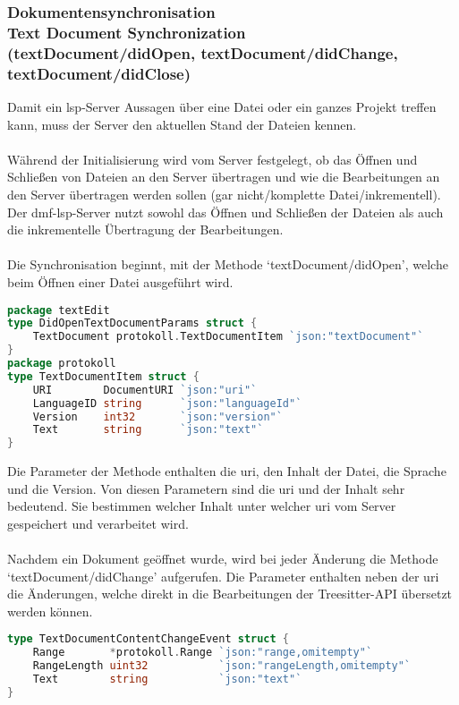 \documentclass[./einleitung.tex]{subfiles}
\begin{document}
    \subsubsection[Dokumentensynchronisation]{Dokumentensynchronisation\\ {\textnormal{\footnotesize Text Document Synchronization \\ (textDocument/didOpen, textDocument/didChange, textDocument/didClose) \cite{dokumente}}}}\label{subsubsec:dokumenten-synchronisation}
    Damit ein \acrshort{lsp}-Server Aussagen über eine Datei oder ein ganzes Projekt treffen kann, muss der Server den aktuellen Stand der Dateien kennen.
    \\\\
    Während der Initialisierung wird vom Server festgelegt, ob das Öffnen und Schließen von Dateien an den Server übertragen und wie die Bearbeitungen an den Server übertragen werden sollen (gar nicht/komplette Datei/inkrementell).
    Der \acrshort{dmf}-\acrshort{lsp}-Server nutzt sowohl das Öffnen und Schließen der Dateien als auch die inkrementelle Übertragung der Bearbeitungen.
    \\\\
    Die Synchronisation beginnt, mit der Methode `textDocument/didOpen', welche beim Öffnen einer Datei ausgeführt wird.
    \begin{lstlisting}[language=Go,title=Definition der Parameter aus zwei Packages, label=lst:dokumenteParams]
package textEdit
type DidOpenTextDocumentParams struct {
	TextDocument protokoll.TextDocumentItem `json:"textDocument"`
}
package protokoll
type TextDocumentItem struct {
	URI        DocumentURI `json:"uri"`
	LanguageID string      `json:"languageId"`
	Version    int32       `json:"version"`
	Text       string      `json:"text"`
}
    \end{lstlisting}
    Die Parameter der Methode enthalten die \acrfull{uri}, den Inhalt der Datei, die Sprache und die Version.
    Von diesen Parametern sind die \acrshort{uri} und der Inhalt sehr bedeutend.
    Sie bestimmen welcher Inhalt unter welcher \acrshort{uri} vom Server gespeichert und verarbeitet wird.
    \\\\
    Nachdem ein Dokument geöffnet wurde, wird bei jeder Änderung die Methode `textDocument/didChange' aufgerufen.
    Die Parameter enthalten neben der \acrshort{uri} die Änderungen, welche direkt in die Bearbeitungen der Treesitter-API übersetzt werden können.
    \begin{lstlisting}[language=Go, title=Definition der Bearbeitungen, label=lst:dokumenteBearbeitung]
type TextDocumentContentChangeEvent struct {
	Range       *protokoll.Range `json:"range,omitempty"`
	RangeLength uint32           `json:"rangeLength,omitempty"`
	Text        string           `json:"text"`
}
    \end{lstlisting}
\end{document}

